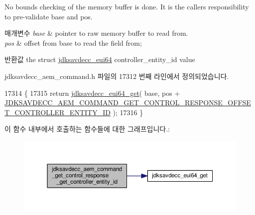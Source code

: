 No bounds checking of the memory buffer is done. It is the caller\textquotesingle{}s responsibility to pre-\/validate base and pos.


\begin{DoxyParams}{매개변수}
{\em base} & pointer to raw memory buffer to read from. \\
\hline
{\em pos} & offset from base to read the field from; \\
\hline
\end{DoxyParams}
\begin{DoxyReturn}{반환값}
the struct \hyperlink{structjdksavdecc__eui64}{jdksavdecc\+\_\+eui64} controller\+\_\+entity\+\_\+id value 
\end{DoxyReturn}


jdksavdecc\+\_\+aem\+\_\+command.\+h 파일의 17312 번째 라인에서 정의되었습니다.


\begin{DoxyCode}
17314 \{
17315     \textcolor{keywordflow}{return} \hyperlink{group__eui64_ga2652311a25a6b91cddbed75c108c7031}{jdksavdecc\_eui64\_get}( base, pos + 
      \hyperlink{group__command__get__control__response_ga2ccc41cefc73cf43693919bcc94f5a1d}{JDKSAVDECC\_AEM\_COMMAND\_GET\_CONTROL\_RESPONSE\_OFFSET\_CONTROLLER\_ENTITY\_ID}
       );
17316 \}
\end{DoxyCode}


이 함수 내부에서 호출하는 함수들에 대한 그래프입니다.\+:
\nopagebreak
\begin{figure}[H]
\begin{center}
\leavevmode
\includegraphics[width=350pt]{group__command__get__control__response_ga1716019174b0339cccfa568804499d47_cgraph}
\end{center}
\end{figure}


